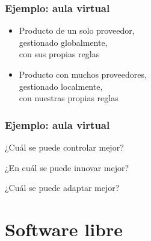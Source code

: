 \documentclass[17pt,aspectratio=169]{beamer}
\renewcommand{\secimage}{figs/bookpages}
\newcommand{\secimage}{figs/bookpages}
\begin{document}

\begin{frame}
\frametitle{Ejemplo: aula virtual}

  \begin{itemize}
  \item Producto de un solo proveedor, \\
    gestionado globalmente, \\
    con sus propias reglas \\
    
  \item Producto con muchos proveedores, \\
    gestionado localmente, \\
    con nuestras propias reglas \\
  \end{itemize}
\end{frame}



\begin{frame}
\frametitle{Ejemplo: aula virtual}

\begin{flushright}
  {\Large
    ¿Cuál se puede controlar mejor? \\

    \vspace{.5cm}
    
    ¿En cuál se puede innovar mejor? \\

    \vspace{.5cm}

    ¿Cuál se puede adaptar mejor? \\
  }
    \end{flushright}

\end{frame}


\renewcommand{\secimage}{figs/software-libre}

\section{Software libre}
\end{document}
